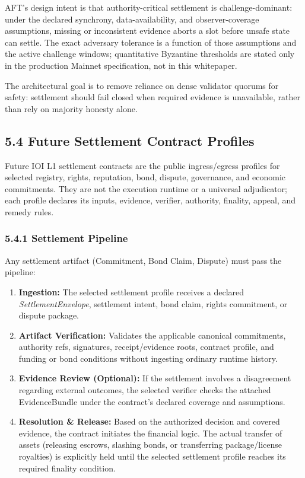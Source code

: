 \documentclass[
  11pt,
]{article}
\providecommand{\tightlist}{%
  \setlength{\itemsep}{0pt}\setlength{\parskip}{0pt}}
\begin{document}
AFT's design intent is that authority-critical settlement is
challenge-dominant: under the declared synchrony, data-availability, and
observer-coverage assumptions, missing or inconsistent evidence aborts a
slot before unsafe state can settle. The exact adversary tolerance is a
function of those assumptions and the active challenge windows;
quantitative Byzantine thresholds are stated only in the production
Mainnet specification, not in this whitepaper.

The architectural goal is to remove reliance on dense validator quorums
for safety: settlement should fail closed when required evidence is
unavailable, rather than rely on majority honesty alone.

\hypertarget{the-settlement-core}{%
\subsection{5.4 Future Settlement Contract
Profiles}\label{the-settlement-core}}

Future IOI L1 settlement contracts are the public ingress/egress profiles for
selected registry, rights, reputation, bond, dispute, governance, and
economic commitments. They are not the execution runtime or a universal
adjudicator; each profile declares its inputs, evidence, verifier, authority,
finality, appeal, and remedy rules.

\hypertarget{settlement-pipeline}{%
\subsubsection{5.4.1 Settlement Pipeline}\label{settlement-pipeline}}

Any settlement artifact (Commitment, Bond Claim, Dispute) must pass the
pipeline:

\begin{enumerate}
\def\labelenumi{\arabic{enumi}.}
\tightlist
\item
  \textbf{Ingestion:} The selected settlement profile receives a declared
  \emph{SettlementEnvelope}, settlement intent, bond claim, rights commitment,
  or dispute package.
\item
  \textbf{Artifact Verification:} Validates the applicable canonical
  commitments, authority refs, signatures, receipt/evidence roots, contract
  profile, and funding or bond conditions without ingesting ordinary runtime
  history.
\item
  \textbf{Evidence Review (Optional):} If the settlement involves a
  disagreement regarding external outcomes, the selected verifier checks the
  attached EvidenceBundle under the contract's declared coverage and
  assumptions.
\item
  \textbf{Resolution \& Release:} Based on the authorized decision and
  covered evidence, the contract initiates the financial logic. The actual
  transfer of assets (releasing escrows, slashing bonds, or transferring
  package/license royalties) is explicitly held until the selected
  settlement profile reaches its required finality condition.
\end{enumerate}
\end{document}
